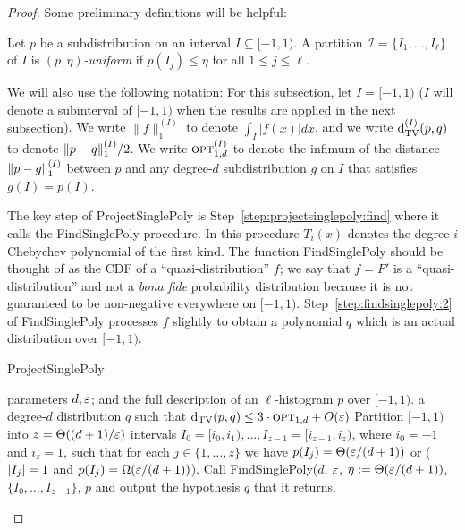 \begin{proof}
\newcommand{\rr}{{r}}
\newcommand{\pp}{{p}}
Some preliminary definitions will be helpful:
\begin{definition}
  Let $p$ be a subdistribution on an interval $I \subseteq [-1,1)$.
  A partition $\mathcal{I} = \{I_1, \dots, I_\ell\}$ of $I$ is
  \emph{$(p,\eta)$-uniform} if $p(I_j) \leq \eta$ for all $1\leq j\leq \ell$.
\end{definition}

We will also use the following notation:  For this subsection, let $I = {[-1,1)}$ ({$I$ will denote a subinterval of $[-1,1)$ when the results
are applied in the next subsection}).
We write $\|f\|^{(I)}_{1}$ to denote $\int_{I} |f(x)| dx$,
and we write $\operatorname{d}_{\rm{TV}}^{(I)}(p,q)$ to denote ${\lVert p-q{\rVert}}_1^{(I)}/2$.
We write ${\textsc{opt}}^{(I)}_{1,d}$ to denote the {infimum of the} 
distance ${\lVert p-g{\rVert}}_1^{(I)}$ between $p$ and any degree-$d$
subdistribution $g$ on $I$ that satisfies $g(I) = p(I)$.

The key step of {\sc ProjectSinglePoly} is 
Step~\ref{step:projectsinglepoly:find} where it calls the {\sc FindSinglePoly} procedure.
In this procedure
$T_i(x)$ denotes the degree-$i$ Chebychev polynomial
of the first kind.
The function {\sc FindSinglePoly} should be thought of
as the CDF of a ``quasi-distribution'' $f$; we say that
$f=F'$ is a ``quasi-distribution'' 
and not a \textit{bona fide} probability distribution because it is
not guaranteed to be non-negative everywhere on $[-1,1)$.  Step~\ref{step:findsinglepoly:2}
of {\sc FindSinglePoly} processes
$f$ slightly to obtain a polynomial $q$ which is an actual distribution over
$[-1,1).$
\begin{algorithm}
  \caption{{\sc ProjectSinglePoly}}
  \begin{algorithmic}[1]
    \Require parameters $d,\varepsilon$; and the full description of an $\ell$-histogram $p$ over $[-1,1)$.
    \Ensure a degree-$d$ distribution $q$ such that $\operatorname{d}_{\rm{TV}}(p,q) \leq 3 \cdot {\textsc{opt}}_{1,d} + O(\varepsilon)$
    \State Partition $[-1,1)$ into $z = \Theta((d+1)/\varepsilon)$ intervals $I_0 = [i_0,i_1), \dots, I_{z-1}=[i_{z-1},i_z)$, where $i_0=-1$ and $i_z=1$, such that
  for each $j \in \{1,\dots,z\}$ we have $p(I_j) = \Theta(\varepsilon/(d+1))$ or ($\left\lvert I_j \right\rvert=1$ and $p(I_j)=\bigOmega{\eps/(d+1)}$).
    \State\label{step:projectsinglepoly:find} Call {\sc FindSinglePoly}($d$, $\varepsilon$, $\eta:=\Theta(\varepsilon/(d+1))$, $\{I_0,\dots,I_{z-1}\}$, $p$ and output the hypothesis $q$ that it returns.
  \end{algorithmic}
\end{algorithm}



\end{proof}

